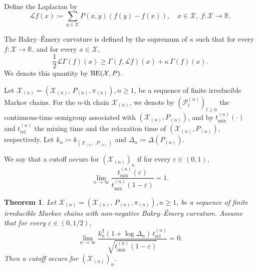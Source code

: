 \documentclass[a4paper, reqno, 11pt]{amsart}
\newtheorem{Thm}{Theorem}[section]
\theoremstyle{definition}
\begin{document}
Define the Laplacian by 
\[\mathcal{L} f(x)\coloneqq \sum_{y\in\mathcal{X}} P(x,y)\left(f(y)-f(x)\right), \quad x \in \mathcal{X},\ f \colon \mathcal{X} \to \mathbb{R}.\]

The Bakry--\'Emery curvature is defined by the supremum of $\kappa$ such that  for every $f : \mathcal{X}\to\mathbb{R}$, and for every $x \in \mathcal{X}$, 
\[ \frac{1}{2} \mathcal{L}\Gamma(f)(x)\ge \Gamma(f,\mathcal{L}f)(x)+\kappa\,\Gamma(f)(x).\] 
We denote this quantity by $\textup{BE}(\mathcal{X}, P)$. 


Let $\mathcal{X}_{(n)} = \left(\mathcal{X}_{(n)},\,P_{(n)},\pi_{(n)}\right), n \ge 1$, be a sequence of finite irreducible Markov chains.
For the $n$-th chain $\mathcal{X}_{(n)}$,
we denote by $(\mathscr{P}_t^{(n)})_{t \ge 0}$ the continuous-time semigroup associated with $(\mathcal{X}_{(n)}, P_{(n)})$,
and by $t_{\mathrm{mix}}^{(n)}(\cdot)$ and $t_{\mathrm{rel}}^{(n)}$ the mixing time and the relaxation time of $(\mathcal{X}_{(n)}, P_{(n)})$, respectively.
Let $k_n \coloneqq k_{(\mathcal{X}_{(n)}, P_{(n)})}$ and $\Delta_n \coloneqq \Delta(P_{(n)})$.


We say that a cutoff occurs for $(\mathcal{X}_{(n)})_n$ if for every $\varepsilon \in (0,1)$,
\[ \lim_{n\to\infty} \frac{t_{\mathrm{mix}}^{(n)}(\varepsilon)}{t_{\mathrm{mix}}^{(n)}(1-\varepsilon)} = 1. \]


\begin{Thm}\label{thm:main}
Let $\mathcal{X}_{(n)} = \left(\mathcal{X}_{(n)},\,P_{(n)},\pi_{(n)}\right), n \ge 1$,
be a sequence of finite irreducible Markov chains with non-negative Bakry--\'Emery curvature.
Assume that for every $\varepsilon \in \left(0,1/2\right)$,
\begin{equation}\label{eq:main-assumption}
\lim_{n \to \infty} \frac{k_n^{2}\left(1+\log \Delta_n\right)\,t_{\mathrm{rel}}^{(n)}}{\sqrt{t_{\mathrm{mix}}^{(n)}(1-\varepsilon)}} = 0.
\end{equation}
Then a cutoff occurs for $\left(\mathcal{X}_{(n)} \right)_n$.
\end{Thm}
\end{document}
